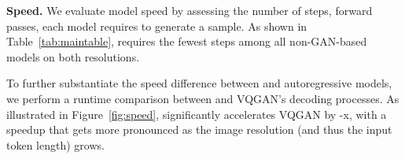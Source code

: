 \setlength{\tabcolsep}{4pt}
\begin{table}[h]
\small
    \centering
\vspace{-2mm}
    \caption{\textbf{Quantitative Comparisons for Inpainting and Outpainting on Places2.} \footnotesize{ evaluated on 512512 samples while others evaluated on the corresponding 256256 ones, consistent with their training; ~taken from the prior work; ~evaluated using the released model trained on a subset of Places2; ~evaluated using the TFHub model\cite{boundless_tfhub}.} }
    \label{tab:inpaint_uncrop}
    \vspace{-3mm}
\end{table}


 \noindent\textbf{Speed.} 
We evaluate model speed by assessing the number of steps, \ie forward passes, each model requires to generate a sample. As shown in Table~\ref{tab:maintable}, \model requires the fewest steps among all non-GAN-based models on both resolutions.

To further substantiate the speed difference between \model and autoregressive models, we perform a runtime comparison between \model and VQGAN's decoding processes. As illustrated in Figure~\ref{fig:speed}, \model significantly accelerates VQGAN by -x, with a speedup that gets more pronounced as the image resolution (and thus the input token length) grows.


